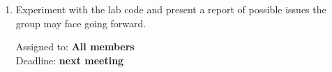 \documentclass{cce2014-meetings}
\begin{document}
\begin{enumerate}

      \item Experiment with the lab code and present a report of possible issues the group may face going forward.
            \begin{flushright}
                  Assigned to: \textbf{All members} \\
                  Deadline: \textbf{next meeting}
            \end{flushright}


\end{enumerate}
\end{document}
